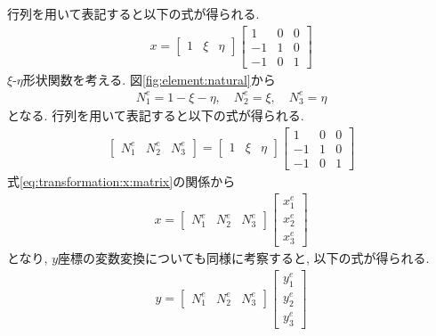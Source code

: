 \documentclass[paper=a4]{jlreq}
\begin{document}
行列を用いて表記すると以下の式が得られる.
\begin{align}
    x    =
    \begin{bmatrix}
        1 & \xi & \eta
    \end{bmatrix}
    \begin{bmatrix}
        1 & 0 & 0 \\
        -1 & 1 & 0 \\
        -1 & 0 & 1
    \end{bmatrix}
    \label{eq:transformation:x:matrix}
\end{align}
$\xi$-$\eta$形状関数を考える. 
図\ref{fig:element:natural}から
\begin{align}
    N^e_1 = 1-\xi-\eta,\quad N^e_2 = \xi,\quad N^e_3 =\eta
\end{align}
となる. 
行列を用いて表記すると以下の式が得られる.
\begin{align}
    \begin{bmatrix}
        N^e_1 & N^e_2 & N^e_3
    \end{bmatrix}
    =
    \begin{bmatrix}
        1 & \xi & \eta
    \end{bmatrix}
    \begin{bmatrix}
        1 & 0 & 0 \\
        -1 & 1 & 0 \\
        -1 & 0 & 1
    \end{bmatrix}
\end{align}
式\eqref{eq:transformation:x:matrix}の関係から
\begin{align}
    x = 
    \begin{bmatrix}
        N^e_1 & N^e_2 & N^e_3
    \end{bmatrix}
    \begin{bmatrix}
        x^e_1 \\ x^e_2 \\ x^e_3
    \end{bmatrix}
\end{align}
となり, $y$座標の変数変換についても同様に考察すると, 以下の式が得られる.
\begin{align}
    y = 
    \begin{bmatrix}
        N^e_1 & N^e_2 & N^e_3
    \end{bmatrix}
    \begin{bmatrix}
        y^e_1 \\ y^e_2 \\ y^e_3
    \end{bmatrix}
\end{align}
\end{document}
